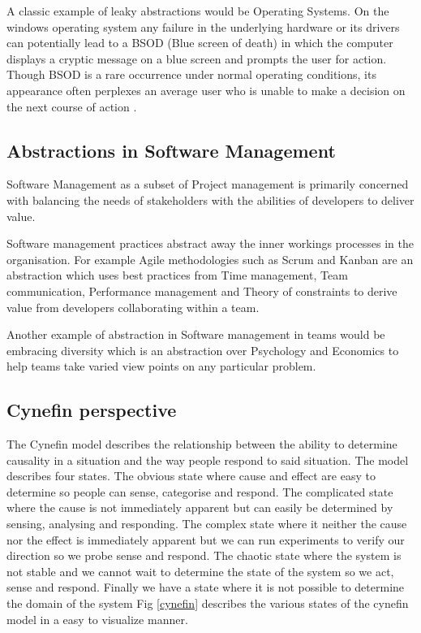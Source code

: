 \documentclass[12pt,conference]{IEEEtran}
\begin{document}
A classic example of leaky abstractions would be Operating Systems. On the windows operating system any failure in the underlying hardware or its drivers can potentially lead to a BSOD (Blue screen of death) in which the computer displays a cryptic message on a blue screen and prompts the user for action. Though BSOD is a rare occurrence under normal operating conditions, its appearance often perplexes an average user who is unable to make a decision on the next course of action \cite{rosenberg_law_2007}. 

\subsection*{Abstractions in Software Management}

Software Management as a subset of Project management is primarily concerned with balancing the needs of stakeholders with the abilities of developers to deliver value.

Software management practices abstract away the inner workings processes in the organisation. For example Agile methodologies such as Scrum and Kanban are an abstraction which uses best practices from Time management, Team communication, Performance management and Theory of constraints to derive value from developers collaborating within a team. 

Another example of abstraction in Software management in teams would be embracing diversity which is an abstraction over Psychology and Economics to help teams take varied view points on any particular problem. 

\subsection*{Cynefin perspective}

The Cynefin model describes the relationship between the ability to determine causality in a situation and the way people respond to said situation. The model describes four states. The obvious state where cause and effect are easy to determine so people can sense, categorise and respond. The complicated state where the cause is not immediately apparent but can easily be determined by sensing, analysing and responding. The complex state where it neither the cause nor the effect is immediately apparent but we can run experiments to verify our direction so we probe sense and respond. The chaotic state where the system is not stable and we cannot wait to determine the state of the system so we act, sense and respond. Finally we have a state where it is not possible to determine the domain of the system
Fig \ref{cynefin} describes the various states of the cynefin model in a easy to visualize manner.
\end{document}
